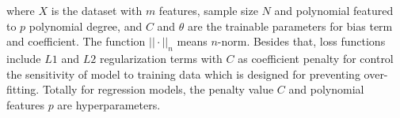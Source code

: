 \vspace*{0.1em}
\begin{multicols}{2}
where $X$ is the dataset with $m$ features, sample size $N$ and polynomial 
featured to $p$ polynomial degree, 
and $C$ and $\theta$ are the trainable parameters for bias term and 
coefficient.
The function $||\cdot||_{n}$ means $n$-norm.
Besides that, loss functions include $L1$ and $L2$ regularization terms with 
$C$ as coefficient penalty for control the sensitivity of model to 
training data which is designed for preventing over-fitting. 
Totally for regression models, the penalty value $C$ and polynomial features $p$ 
are hyperparameters.



\end{multicols}
